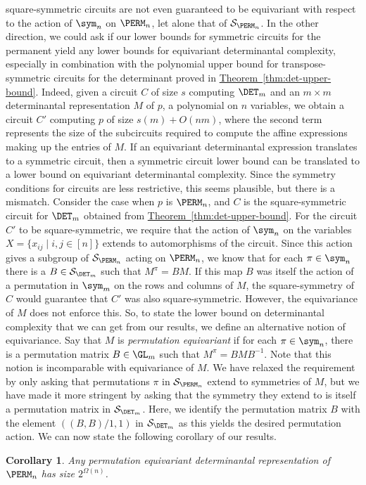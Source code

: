 \documentclass[11pt]{article}
\newcommand{\expref}[2]{\texorpdfstring{\hyperref[#2]{#1~\ref{#2}}}{#1~\ref{#2}}}
\newtheorem{corollary}[theorem]{Corollary}
\begin{document}
square-symmetric %
circuits are not even guaranteed to be equivariant with respect to the action of $\sym_n$ on $\PERM_n$, let alone that of $\mathcal{S}_{\PERM_n}$.
In the other direction, we could ask if our lower bounds for symmetric circuits for the permanent yield any lower bounds for equivariant determinantal complexity, especially in combination with the polynomial upper bound for transpose-symmetric circuits for the determinant proved in \expref{Theorem}{thm:det-upper-bound}.  Indeed, given a circuit $C$ of size $s$ computing $\DET_m$ and an $m\times m$ determinantal representation $M$ of $p$, a polynomial on $n$ variables, we obtain a circuit $C'$ computing $p$ of size $s(m)+ O(nm)$, where the second term represents the size of the subcircuits required to compute the affine expressions making up the entries of $M$.  If an equivariant determinantal expression translates to a symmetric circuit, then a symmetric circuit lower bound can be translated to a lower bound on equivariant determinantal complexity.  Since the symmetry conditions for circuits are less restrictive, this seems plausible, but there is a mismatch.
Consider the case when $p$ is $\PERM_n$, and $C$ is the
square-symmetric %
circuit for $\DET_m$ obtained from \expref{Theorem}{thm:det-upper-bound}.  For the circuit $C'$ to be square-symmetric, we require that the action of $\sym_n$ on the variables $X =\{x_{ij} \mid i,j \in [n]\}$ extends to automorphisms of the circuit.  Since this action gives a subgroup of $\mathcal{S}_{\PERM_n}$ acting on $\PERM_n$, we know that for each $\pi \in \sym_n$ there is a $B \in \mathcal{S}_{\DET_m}$ such that $M^{\pi} = BM$.  If this map $B$ was itself the action of a permutation in $\sym_m$ on the rows and columns of $M$, the square-symmetry of $C$ would guarantee that $C'$ was also square-symmetric.  %
However, the equivariance of $M$ does not enforce this.  So, to state the lower bound on determinantal complexity that we can get from our results, we define an alternative notion of equivariance.
Say that $M$ is \emph{permutation equivariant} if for each $\pi \in
\sym_n$, there is a permutation matrix $B \in \GL_m$ such that
$M^{\pi} = BMB^{-1}$.  Note that this notion is incomparable with
equivariance of $M$.  We have relaxed the requirement by only asking
that permutations $\pi$ in $\mathcal{S}_{\PERM_n}$ extend to
symmetries of $M$, but we have made it more stringent by asking that
the symmetry they extend to is itself a permutation matrix in
$\mathcal{S}_{\DET_m}$.  Here, we identify the permutation matrix $B$
with the element $((B,B)/1,1)$ in $\mathcal{S}_{\DET_m}$ as this yields
the desired permutation action.
We can now state the following corollary of our results.
\begin{corollary}
Any permutation equivariant determinantal representation of $\PERM_n$ has size $2^{\Omega(n)}$.
\end{corollary}
\end{document}
